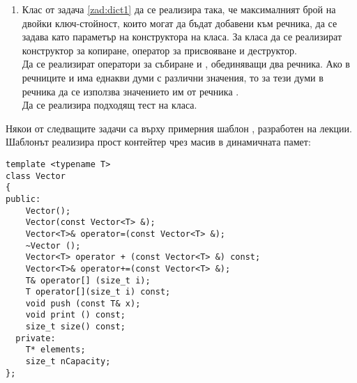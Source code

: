 \begin{enumerate}[resume]
  \item Клас  от задача \ref{zad:dict1} да се реализира така, че максималният брой  на двойки ключ-стойност, които могат да бъдат добавени към речника, да се задава като параметър на конструктора на класа. За класа да се реализират конструктор за копиране, оператор за присвояване и деструктор.\\

 Да се реализират оператори за събиране \code{+} и \code{+=}, обединяващи два речника. Ако в речниците  и  има еднакви думи с различни значения, то за тези думи в речника  да се използва значението им от речника . \\

 Да се реализира подходящ тест на класа.

\end{enumerate}
\begin{mdframed}[hidealllines=true,backgroundcolor=gray!20]
Някои от следващите задачи са върху примерния шаблон , разработен на лекции. Шаблонът реализира прост контейтер чрез масив в динамичната памет:
\begin{verbatim}
template <typename T>
class Vector
{
public:
    Vector();
    Vector(const Vector<T> &);
    Vector<T>& operator=(const Vector<T> &);
    ~Vector ();
    Vector<T> operator + (const Vector<T> &) const;
    Vector<T>& operator+=(const Vector<T> &);
    T& operator[] (size_t i);
    T operator[](size_t i) const;
    void push (const T& x);
    void print () const;
    size_t size() const;
  private:
    T* elements;
    size_t nCapacity;
};

\end{verbatim}
\end{mdframed}
